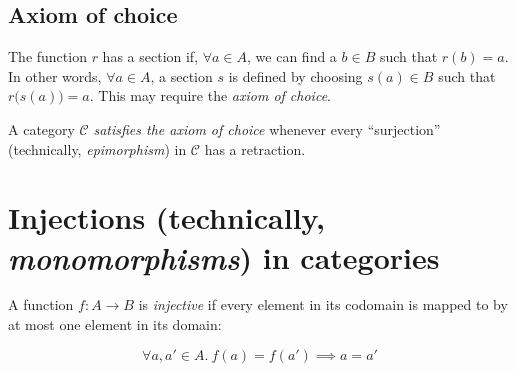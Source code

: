 \subsection{Axiom of choice}
\begin{center}
\end{center}

The function $r$ has a section if, $\forall a \in A$, we can find a $b \in B$
such that $r(b) = a$.  In other words, $\forall a \in A$, a section $s$ is
defined by choosing $s(a) \in B$ such that $r\big(s(a)\big) = a$.  This may
require the \emph{axiom of choice}.

\begin{definition}
A category $\mathcal{C}$ \emph{satisfies the axiom of choice} whenever every
``surjection'' (technically, \emph{epimorphism}) in $\mathcal{C}$ has a
retraction.  
\end{definition}

\section{Injections (technically, \emph{monomorphisms}) in categories}

A function $f : A \rightarrow B$ is \emph{injective} if every element in its
codomain is mapped to by at most one element in its domain:

\begin{equation*}
    \forall a, a' \in A.\ f(a) = f(a') \implies a = a'
\end{equation*}

